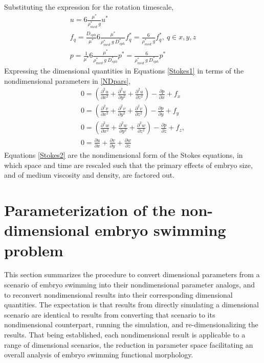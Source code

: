 \documentclass[10pt,a4paper]{article}
\def\non{\nonumber}
\def\p{\partial}
\begin{document}
Substituting the expression for the rotation timescale,
\begin{eqnarray}\label{NDpars}
	u = 6 \frac{\mu^*}{\rho^*_{med} ~ g } u^* \non \\
	f_q = \frac{D_{sph}}{\mu^*} 6 \frac{\mu^*}{\rho^*_{med} ~ g ~ D_{sph}^*} f_q^* = \frac{6}{\rho^*_{med}~  g} f_q^*, ~ q \in x, y, z \non \\
	p = \frac{1}{\mu^*} 6 \frac{\mu^*}{\rho^*_{med} ~ g ~ D_{sph}^*} p^* = \frac{6}{\rho^*_{med} ~ g ~ D_{sph}^*} p^*
\end{eqnarray}
Expressing the dimensional quantities in Equations \ref{Stokes1} in terms of the nondimensional parameters in \ref{NDpars}, 
\begin{eqnarray}\label{Stokes2}
	0 = \left( \frac{\p^2 u}{\p x^2}+\frac{\p^2 u}{\p y^2}+\frac{\p^2 u}{\p z^2} \right) - \frac{\p p}{\p x} + f_x \non \\
	0 = \left( \frac{\p^2 v}{\p x^2}+\frac{\p^2 v}{\p y^2}+\frac{\p^2 v}{\p z^2} \right) - \frac{\p p}{\p y} + f_y \non \\
	0 = \left( \frac{\p^2 w}{\p x^2}+\frac{\p^2 w}{\p y^2}+\frac{\p^2 w}{\p z^2} \right) - \frac{\p p}{\p z} + f_z , \non \\
	0 =  \frac{\p u}{\p {x}}+\frac{\p v}{\p {y}}+\frac{\p w}{\p {z}}
\end{eqnarray}
Equations \ref{Stokes2} are the nondimensional form of the Stokes equations, in which space and time are rescaled such that the primary effects of embryo size, and of medium viscosity and density, are factored out.  

\section{Parameterization of the non-dimensional embryo swimming problem}\label{NDparsSect}
This section summarizes the procedure to convert dimensional parameters from a scenario of embryo swimming into their nondimensional parameter analogs, and to reconvert nondimensional results into their corresponding dimensional quantities.
The expectation is that results from directly simulating a dimensional scenario are identical to results from converting that scenario to its nondimensional counterpart, running the simulation, and re-dimensionalizing the results.
That being established, each nondimensional result is applicable to a range of dimensional scenarios, the reduction in parameter space facilitating an overall analysis of embryo swimming functional morphology.
\end{document}
